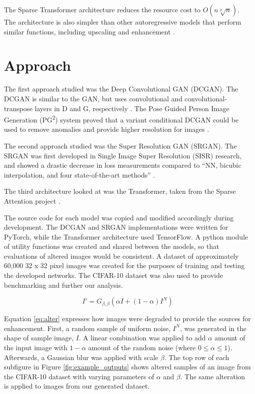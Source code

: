 \documentclass[letterpaper]{article} %
\begin{document}
The Sparse Transformer architecture reduces the resource cost to
$O(n\sqrt[p]{n})$.
The architecture is also simpler than other autoregressive models that perform
similar functions, including upscaling and enhancement \cite{pixel_subscale}.

\section{Approach}
The first approach studied was the
Deep Convolutional GAN (DCGAN).
The DCGAN
is similar to the GAN,
but uses convolutional and convolutional-transpose layers in D and G, respectively
\cite{unsupervised_learning}.
The Pose Guided Person Image Generation (PG\textsuperscript{2}) system
proved that a variant conditional DCGAN could be used to
remove anomalies and provide higher resolution for images
\cite{pose_guided_image_generation}.

The second approach studied was the
Super Resolution GAN (SRGAN).
The SRGAN was first developed in
Single Image Super Resolution (SISR) research, and showed a drastic decrease in loss measurements
compared to ``NN, bicubic interpolation, and four state-of-the-art methods''
\cite{srgan}.

The third architecture looked at was the Transformer,
taken from the Sparse Attention project \cite{generative_transformers}.

The source code for each model was copied and modified accordingly
during development.
The DCGAN and SRGAN implementations were written for PyTorch,
while the Transformer architecture used TensorFlow.
A python module of utility functions was created and shared between the models,
so that evaluations of altered images would be consistent.
A dataset of approximately 60,000 32 x 32 pixel images was created
for the purposes of training and testing the developed networks.
The CIFAR-10 dataset was also used to provide
benchmarking and further our analysis.

\begin{equation}
\label{eq:alter}
I' = G_{\beta,\beta}(\alpha I + (1 - \alpha)I^{N})
\end{equation}

Equation \ref{eq:alter} expresses how images were degraded to provide the sources for enhancement.
First, a random sample of uniform noise, $I^{N}$, was generated in the shape of
sample image, $I$. A linear combination was applied to add $\alpha$ amount of the input
image with $1 - \alpha$ amount of the random noise
(where $0 \leq \alpha \leq 1$).
Afterwards, a Gaussian blur was applied with scale $\beta$.
The top row of each subfigure in Figure \ref{fig:example_outputs} shows altered samples
of an image from the CIFAR-10 dataset with varying parameters of $\alpha$ and $\beta$.
The same alteration is applied to images from our generated dataset.
\end{document}
